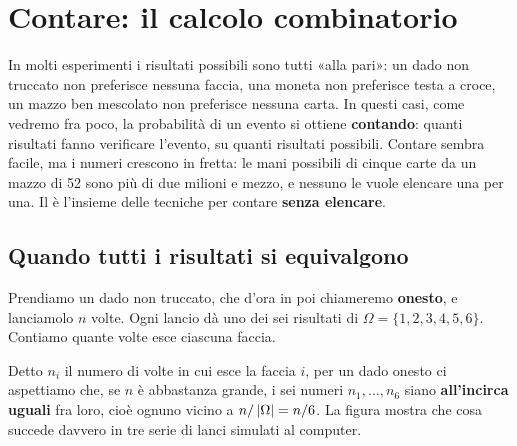 \chapter{Contare: il calcolo combinatorio}

In molti esperimenti i risultati possibili sono tutti «alla pari»: un dado non truccato non preferisce nessuna faccia,
una moneta non preferisce testa a croce, un mazzo ben mescolato non preferisce nessuna carta. In questi casi, come
vedremo fra poco, la probabilità di un evento si ottiene \textbf{contando}: quanti risultati fanno verificare
l'evento, su quanti risultati possibili. Contare sembra facile, ma i numeri crescono in fretta: le mani possibili di
cinque carte da un mazzo di 52 sono più di due milioni e mezzo, e nessuno le vuole elencare una per una. Il
 è l'insieme delle tecniche per contare \textbf{senza elencare}.

\section{Quando tutti i risultati si equivalgono}

Prendiamo un dado non truccato, che d'ora in poi chiameremo \textbf{onesto}, e lanciamolo $n$ volte. Ogni lancio dà
uno dei sei risultati di $\Omega = \{1, 2, 3, 4, 5, 6\}$. Contiamo quante volte esce ciascuna faccia.


Detto $n_i$ il numero di volte in cui esce la faccia $i$, per un dado onesto ci aspettiamo che, se $n$ è abbastanza
grande, i sei numeri $n_1, \ldots, n_6$ siano \textbf{all'incirca uguali} fra loro, cioè ognuno vicino a
$n / \left\lvert \Omega \right\rvert = n/6$. La figura mostra che cosa succede davvero in tre serie di lanci simulati al computer.

